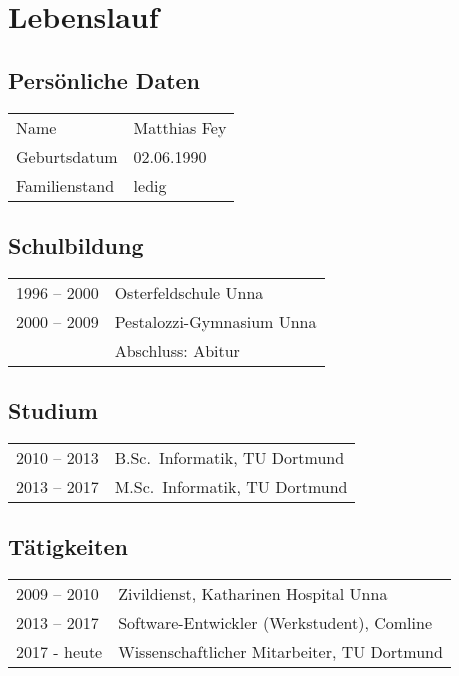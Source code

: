 \documentclass[10pt]{scrartcl}
\begin{document}

\section*{Lebenslauf}

\subsection*{Persönliche Daten}

\begin{tabular}{p{3cm}p{13cm}}
Name          & Matthias Fey\\
Geburtsdatum  & 02.06.1990\\
Familienstand & ledig\\
\end{tabular}

\subsection*{Schulbildung}

\begin{tabular}{p{3cm}p{13cm}}
1996 – 2000 & Osterfeldschule Unna\\
2000 – 2009 & Pestalozzi-Gymnasium Unna\\
            & Abschluss: Abitur\\
\end{tabular}

\subsection*{Studium}

\begin{tabular}{p{3cm}p{13cm}}
2010 – 2013  & B.Sc.\ Informatik, TU Dortmund\\
2013 – 2017 & M.Sc.\ Informatik, TU Dortmund\\
\end{tabular}

\subsection*{Tätigkeiten}

\begin{tabular}{p{3cm}p{13cm}}
2009 – 2010 & Zivildienst, Katharinen Hospital Unna\\
2013 – 2017 & Software-Entwickler (Werkstudent), Comline\\
2017 - heute & Wissenschaftlicher Mitarbeiter, TU Dortmund\\
\end{tabular}
\end{document}

